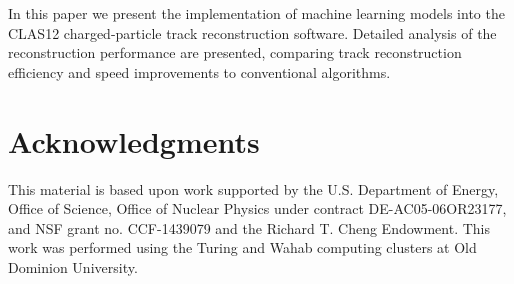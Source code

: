 \documentclass[aps,prl,preprint,12pt]{revtex4}
\begin{document}
In this paper we present the implementation of machine learning models into the CLAS12 charged-particle track 
reconstruction software. Detailed analysis of the reconstruction performance are presented, comparing track 
reconstruction efficiency and speed improvements to conventional algorithms.







\section{Acknowledgments}

This material is based upon work supported by the U.S. Department of Energy, Office of Science, Office of Nuclear 
Physics under contract DE-AC05-06OR23177, and NSF grant no. CCF-1439079 and the Richard T. Cheng Endowment. 
This  work  was  performed  using  the  Turing  and  Wahab computing clusters at Old Dominion University.
 
\newpage


\end{document}
